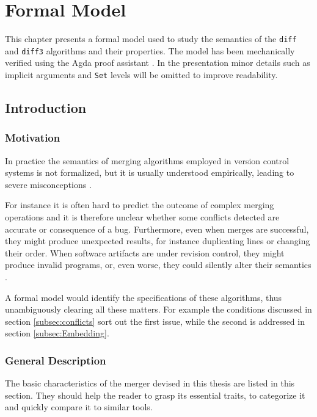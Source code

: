 \documentclass[../Thesis.tex]{subfiles}
\begin{document}
\chapter{Formal Model}
This chapter presents a formal model used to study the semantics of the \texttt{diff} and \texttt{diff3} algorithms and their properties.
The model has been mechanically verified using the Agda proof assistant
\cite{Bove09, NorellPhd, Norell08}.
In the presentation minor details such as implicit arguments and \texttt{Set} levels will be omitted to improve readability. 	

\section{Introduction}

	\subsection{Motivation}
	In practice the semantics of merging algorithms employed in version control 
	systems is not formalized, but it is usually understood empirically,
	leading to severe misconceptions \cite{PierceDiff3}.
	
	For instance it is often hard to predict the outcome of complex merging 	
	operations and it is therefore unclear whether some conflicts detected are 	
	accurate or consequence of a bug. 
	Furthermore, even when merges are successful, they might produce 
	unexpected	results, for instance duplicating lines or changing their order.
	When software artifacts are under revision control, they might produce 
	invalid programs, or, even worse, they could silently alter 
	their semantics \cite{Mens02}.

	A formal model would identify the specifications of these algorithms,
	thus unambiguously clearing all these matters.
	For example the conditions discussed in section \ref{subsec:conflicts}
	sort out the first issue, while the second is addressed in section 
	\ref{subsec:Embedding}.

	\subsection{General Description}
	The basic characteristics of the merger devised in this thesis
	are listed in this section. They should help the reader to grasp
	its essential traits, to categorize it and quickly compare it to similar tools.
	
\end{document}
